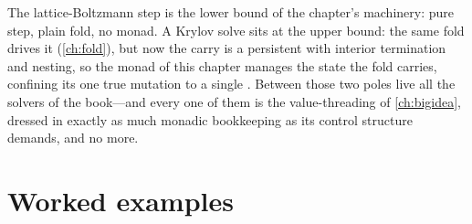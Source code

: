 The lattice-Boltzmann step is the lower bound of the chapter's machinery: pure step,
plain fold, no monad. A Krylov solve sits at the upper bound: the same fold drives it
(\cref{ch:fold}), but now the carry is a persistent  with interior
termination and nesting, so the monad of this chapter manages the state the fold
carries, confining its one true mutation to a single . Between those two
poles live all the solvers of the book---and every one of them is the value-threading
of \cref{ch:bigidea}, dressed in exactly as much monadic bookkeeping as its control
structure demands, and no more.

\section{Worked examples}
\label{sec:worked}

